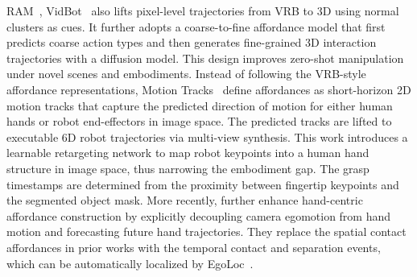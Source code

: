 \documentclass[Afour,sageh,times]{sagej}
\begin{document}
RAM~\citep{kuang2024ram}, VidBot~\citep{chen2025vidbot} also lifts pixel-level trajectories from VRB to 3D using normal clusters as cues. It further adopts a coarse-to-fine affordance model that first predicts coarse action types and then generates fine-grained 3D interaction trajectories with a diffusion model. This design improves zero-shot manipulation under novel scenes and embodiments. Instead of following the VRB-style affordance representations, Motion Tracks~\citep{ren2025motion} define affordances as short-horizon 2D motion tracks that capture the predicted direction of motion for either human hands or robot end-effectors in image space. The predicted tracks are lifted to executable 6D robot trajectories via multi-view synthesis. This work introduces a learnable retargeting network to map robot keypoints into a human hand structure in image space, thus narrowing the embodiment gap. The grasp timestamps are determined from the proximity between fingertip keypoints and the segmented object mask. More recently, \cite{ma2025uni} further enhance hand-centric affordance construction by explicitly decoupling camera egomotion from hand motion and forecasting future hand trajectories. They replace the spatial contact affordances in prior works with the temporal contact and separation events, which can be automatically localized by EgoLoc~\citep{zhang2025zero,ma2025egoloc}.
\end{document}

